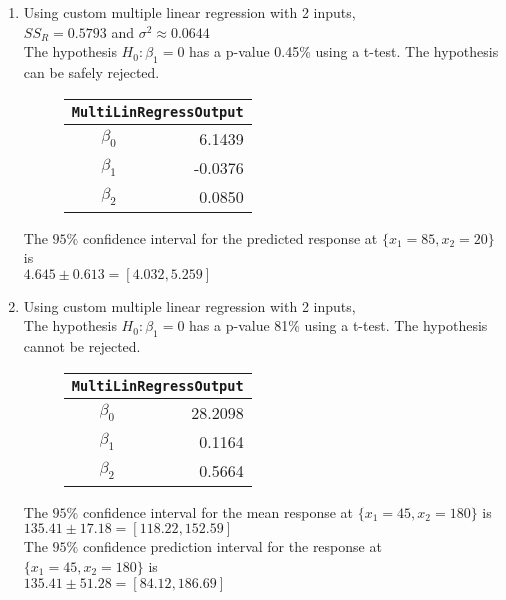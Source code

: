 \begin{enumerate}
\item Using custom multiple linear regression with 2 inputs, \\
$ SS_R = 0.5793 $ and $ \sigma^2 \approx 0.0644 $ \\
The hypothesis $ H_0 : \beta_1 = 0$ has a p-value 0.45\% using a t-test. The hypothesis can be safely rejected.\\



\begin{figure}[H]
	\centering
	\begin{tabular}{@{}rr@{}}
		\toprule
		\multicolumn{2}{c}{\texttt{MultiLinRegressOutput}} \\
		\midrule
		$\beta_0$ &           6.1439 \\
		$\beta_1$ &          -0.0376 \\
		$\beta_2$ &           0.0850 \\
		\bottomrule
	\end{tabular}
	
\end{figure}

The $ 95\% $ confidence interval for the predicted response at $ \{x_1 = 85, x_2 = 20\} $ is \\
$ 4.645 \pm 0.613 = [4.032, 5.259]$ \\

\item Using custom multiple linear regression with 2 inputs, \\
The hypothesis $ H_0 : \beta_1 = 0$ has a p-value 81\% using a t-test. The hypothesis cannot be rejected.\\

\begin{figure}[H]
	\centering
	\begin{tabular}{@{}rr@{}}
		\toprule
		\multicolumn{2}{c}{\texttt{MultiLinRegressOutput}} \\
		\midrule
		$\beta_0$ &          28.2098 \\
		$\beta_1$ &           0.1164 \\
		$\beta_2$ &           0.5664 \\
		\bottomrule
	\end{tabular}
	
\end{figure}

The $ 95\% $ confidence interval for the mean response at $ \{x_1 = 45, x_2 = 180\} $ is \\
$ 135.41 \pm 17.18 = [118.22, 152.59]$ \\
The $ 95\% $ confidence prediction interval for the response at $ \{x_1 = 45, x_2 = 180\} $ is \\
$ 135.41 \pm 51.28 = [84.12, 186.69]$ \\



\end{enumerate}
